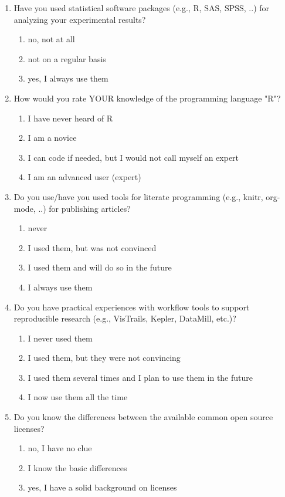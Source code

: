 \documentclass{article}\usepackage[]{graphicx}\usepackage[]{color}
\begin{document}
\begin{enumerate}
\item Have you used statistical software packages (e.g., R, SAS, SPSS,
..) for analyzing your experimental results?
\begin{enumerate}
\item no, not at all
\item not on a regular basis
\item yes, I always use them
\end{enumerate}

\item How would you rate YOUR knowledge of the programming language "R"?
\begin{enumerate}
\item I have never heard of R
\item I am a novice
\item I can code if needed, but I would not call myself an expert
\item I am an advanced user (expert)
\end{enumerate}

\item Do you use/have you used tools for literate programming (e.g., knitr,
org-mode, ..) for publishing articles?
\begin{enumerate}
\item never
\item I used them, but was not convinced
\item I used them and will do so in the future
\item I always use them
\end{enumerate}

\item Do you have practical experiences with workflow tools to support
reproducible research (e.g., VisTrails, Kepler, DataMill, etc.)?
\begin{enumerate}
\item I never used them
\item I used them, but they were not convincing
\item I used them several times and I plan to use them in the future
\item I now use them all the time
\end{enumerate}

\item Do you know the differences between the available common open source
licenses?
\begin{enumerate}
\item no, I have no clue
\item I know the basic differences
\item yes, I have a solid background on licenses
\end{enumerate}


\end{enumerate}
\end{document}

